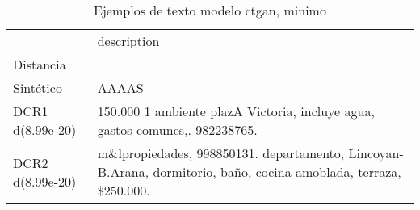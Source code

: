 \begin{table}[H]
\centering
\fontsize{10}{14}\selectfont
\caption{Ejemplos de texto modelo ctgan, minimo}
\label{table-example-economicos-b-2-ctgan-min-text}
\begin{tabular}{|l|m{35em}|}
\hline
\rowcolor[gray]{0.8}
 & description \\
Distancia &  \\
\hline Sintético & AAAAS \\
\hline DCR1 d(8.99e-20) & 150.000 1 ambiente plazA Victoria, incluye agua, gastos comunes,. 982238765. \\
\hline DCR2 d(8.99e-20) & m\&lpropiedades, 998850131. departamento, Lincoyan-B.Arana, dormitorio, ba\~no, cocina amoblada, terraza, \$250.000. \\
\hline
\end{tabular}
\end{table}

